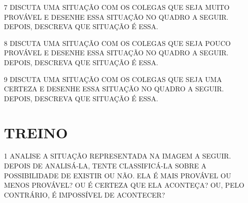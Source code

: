 
\num{7} DISCUTA UMA SITUAÇÃO COM OS COLEGAS QUE SEJA MUITO PROVÁVEL E DESENHE
ESSA SITUAÇÃO NO QUADRO A SEGUIR. DEPOIS, DESCREVA QUE SITUAÇÃO É ESSA.

\begin{mdframed}[linewidth=2pt,linecolor=salmao,roundcorner=10pt]
\vspace{19cm}
\end{mdframed}


\num{8} DISCUTA UMA SITUAÇÃO COM OS COLEGAS QUE SEJA POUCO PROVÁVEL E DESENHE
ESSA SITUAÇÃO NO QUADRO A SEGUIR. DEPOIS, DESCREVA QUE SITUAÇÃO É ESSA.

\begin{mdframed}[linewidth=2pt,linecolor=salmao,roundcorner=10pt]
\vspace{19cm}
\end{mdframed}


\num{9} DISCUTA UMA SITUAÇÃO COM OS COLEGAS QUE SEJA UMA CERTEZA E DESENHE ESSA SITUAÇÃO NO QUADRO A SEGUIR. DEPOIS, DESCREVA QUE SITUAÇÃO É ESSA.

\begin{mdframed}[linewidth=2pt,linecolor=salmao,roundcorner=10pt]
\vspace{19cm}
\end{mdframed}

\section*{TREINO}

\num{1} ANALISE A SITUAÇÃO REPRESENTADA NA 
IMAGEM A SEGUIR. DEPOIS DE ANALISÁ-LA, TENTE 
CLASSIFICÁ-LA SOBRE A POSSIBILIDADE DE EXISTIR 
OU NÃO. ELA É MAIS PROVÁVEL OU MENOS PROVÁVEL?
OU É CERTEZA QUE ELA ACONTEÇA? OU, PELO 
CONTRÁRIO, É IMPOSSÍVEL DE ACONTECER?

